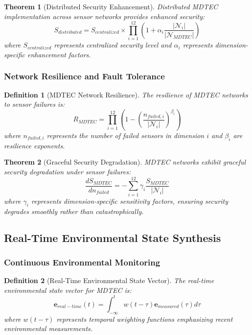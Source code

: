 \documentclass[12pt,a4paper]{article}
\newtheorem{theorem}{Theorem}
\newtheorem{definition}{Definition}
\begin{document}
\begin{theorem}[Distributed Security Enhancement]
Distributed MDTEC implementation across sensor networks provides enhanced security:
\begin{equation}
S_{distributed} = S_{centralized} \times \prod_{i=1}^{12} \left(1 + \alpha_i \frac{|\mathcal{N}_i|}{|\mathcal{N}_{MDTEC}|}\right)
\end{equation}
where $S_{centralized}$ represents centralized security level and $\alpha_i$ represents dimension-specific enhancement factors.
\end{theorem}

\subsubsection{Network Resilience and Fault Tolerance}

\begin{definition}[MDTEC Network Resilience]
The resilience of MDTEC networks to sensor failures is:
\begin{equation}
R_{MDTEC} = \prod_{i=1}^{12} \left(1 - \left(\frac{n_{failed,i}}{|\mathcal{N}_i|}\right)^{\beta_i}\right)
\end{equation}
where $n_{failed,i}$ represents the number of failed sensors in dimension $i$ and $\beta_i$ are resilience exponents.
\end{definition}

\begin{theorem}[Graceful Security Degradation]
MDTEC networks exhibit graceful security degradation under sensor failures:
\begin{equation}
\frac{dS_{MDTEC}}{dn_{failed}} = -\sum_{i=1}^{12} \gamma_i \frac{S_{MDTEC}}{|\mathcal{N}_i|}
\end{equation}
where $\gamma_i$ represents dimension-specific sensitivity factors, ensuring security degrades smoothly rather than catastrophically.
\end{theorem}

\subsection{Real-Time Environmental State Synthesis}

\subsubsection{Continuous Environmental Monitoring}

\begin{definition}[Real-Time Environmental State Vector]
The real-time environmental state vector for MDTEC is:
\begin{equation}
\mathbf{e}_{real-time}(t) = \int_{-\infty}^{t} w(t-\tau) \mathbf{e}_{measured}(\tau) d\tau
\end{equation}
where $w(t-\tau)$ represents temporal weighting functions emphasizing recent environmental measurements.
\end{definition}
\end{document}
